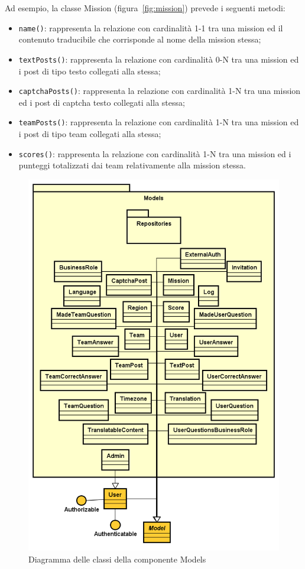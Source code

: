 Ad esempio, la classe Mission (figura~\ref{fig:mission}) prevede i seguenti metodi:

\begin{itemize}
	\item \verb!name()!: rappresenta la relazione con cardinalità 1-1 tra una mission ed il contenuto traducibile che corrisponde al nome della mission stessa;
	\item \verb!textPosts()!: rappresenta la relazione con cardinalità 0-N tra una mission ed i post di tipo testo collegati alla stessa;
	\item \verb!captchaPosts()!: rappresenta la relazione con cardinalità 1-N tra una mission ed i post di captcha testo collegati alla stessa;
	\item \verb!teamPosts()!: rappresenta la relazione con cardinalità 1-N tra una mission ed i post di tipo team collegati alla stessa;
	\item \verb!scores()!: rappresenta la relazione con cardinalità 1-N tra una mission ed i punteggi totalizzati dai team relativamente alla mission stessa.
\end{itemize}

\begin{figure}[H]
	\centering
  \includegraphics[scale=0.55]{immagini/components/models_diagram.png}
  \caption{Diagramma delle classi della componente Models}
	\label{fig:models} 
\end{figure}

